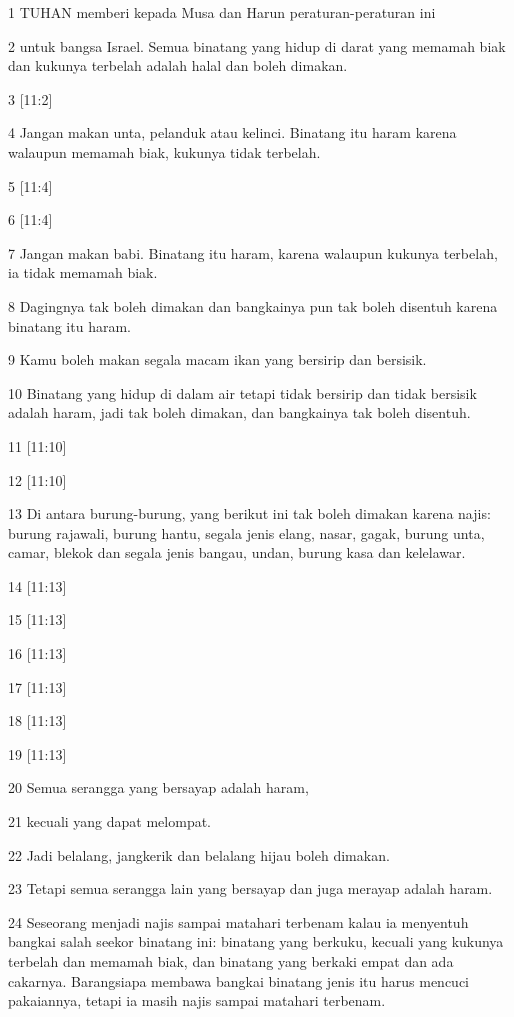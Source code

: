 \par 1 TUHAN memberi kepada Musa dan Harun peraturan-peraturan ini
\par 2 untuk bangsa Israel. Semua binatang yang hidup di darat yang memamah biak dan kukunya terbelah adalah halal dan boleh dimakan.
\par 3 [11:2]
\par 4 Jangan makan unta, pelanduk atau kelinci. Binatang itu haram karena walaupun memamah biak, kukunya tidak terbelah.
\par 5 [11:4]
\par 6 [11:4]
\par 7 Jangan makan babi. Binatang itu haram, karena walaupun kukunya terbelah, ia tidak memamah biak.
\par 8 Dagingnya tak boleh dimakan dan bangkainya pun tak boleh disentuh karena binatang itu haram.
\par 9 Kamu boleh makan segala macam ikan yang bersirip dan bersisik.
\par 10 Binatang yang hidup di dalam air tetapi tidak bersirip dan tidak bersisik adalah haram, jadi tak boleh dimakan, dan bangkainya tak boleh disentuh.
\par 11 [11:10]
\par 12 [11:10]
\par 13 Di antara burung-burung, yang berikut ini tak boleh dimakan karena najis: burung rajawali, burung hantu, segala jenis elang, nasar, gagak, burung unta, camar, blekok dan segala jenis bangau, undan, burung kasa dan kelelawar.
\par 14 [11:13]
\par 15 [11:13]
\par 16 [11:13]
\par 17 [11:13]
\par 18 [11:13]
\par 19 [11:13]
\par 20 Semua serangga yang bersayap adalah haram,
\par 21 kecuali yang dapat melompat.
\par 22 Jadi belalang, jangkerik dan belalang hijau boleh dimakan.
\par 23 Tetapi semua serangga lain yang bersayap dan juga merayap adalah haram.
\par 24 Seseorang menjadi najis sampai matahari terbenam kalau ia menyentuh bangkai salah seekor binatang ini: binatang yang berkuku, kecuali yang kukunya terbelah dan memamah biak, dan binatang yang berkaki empat dan ada cakarnya. Barangsiapa membawa bangkai binatang jenis itu harus mencuci pakaiannya, tetapi ia masih najis sampai matahari terbenam.

